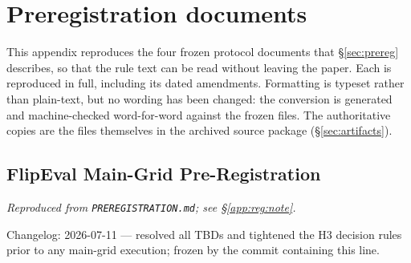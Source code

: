 %
%
%
%

\section{Preregistration documents}  %
\label{app:registrations}  %

\label{app:reg:note}  %
This appendix reproduces the four frozen protocol documents that
\S\ref{sec:prereg} describes, so that the rule text can be read without
leaving the paper. Each is reproduced in full, including its dated
amendments. Formatting is typeset rather than plain-text, but no wording
has been changed: the conversion is generated and machine-checked
word-for-word against the frozen files. The authoritative copies are the
files themselves in the archived source package
(\S\ref{sec:artifacts}).

\subsection{FlipEval Main-Grid Pre-Registration}
\label{app:reg:main}  %
\emph{Reproduced from \texttt{PREREGISTRATION.md}; see \S\ref{app:reg:note}.}  %

Changelog: 2026-07-11 --- resolved all TBDs and tightened the H3 decision rules prior to any main-grid execution; frozen by the commit containing this line.

